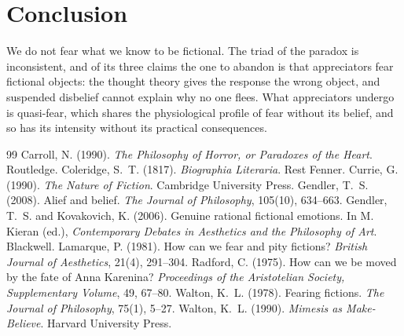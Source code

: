 \documentclass{situationist-preprint}
\begin{document}
\section{Conclusion}

We do not fear what we know to be fictional. The triad of the paradox is inconsistent, and of its three claims the one to abandon is that appreciators fear fictional objects: the thought theory gives the response the wrong object, and suspended disbelief cannot explain why no one flees. What appreciators undergo is quasi-fear, which shares the physiological profile of fear without its belief, and so has its intensity without its practical consequences.

\begin{thebibliography}{99}\small
{} Carroll, N. (1990). \emph{The Philosophy of Horror, or Paradoxes of the Heart}. Routledge.
 Coleridge, S.~T. (1817). \emph{Biographia Literaria}. Rest Fenner.
 Currie, G. (1990). \emph{The Nature of Fiction}. Cambridge University Press.
 Gendler, T.~S. (2008). Alief and belief. \emph{The Journal of Philosophy}, 105(10), 634--663.
 Gendler, T.~S. and Kovakovich, K. (2006). Genuine rational fictional emotions. In M. Kieran (ed.), \emph{Contemporary Debates in Aesthetics and the Philosophy of Art}. Blackwell.
 Lamarque, P. (1981). How can we fear and pity fictions? \emph{British Journal of Aesthetics}, 21(4), 291--304.
 Radford, C. (1975). How can we be moved by the fate of Anna Karenina? \emph{Proceedings of the Aristotelian Society, Supplementary Volume}, 49, 67--80.
 Walton, K.~L. (1978). Fearing fictions. \emph{The Journal of Philosophy}, 75(1), 5--27.
 Walton, K.~L. (1990). \emph{Mimesis as Make-Believe}. Harvard University Press.
\end{thebibliography}
\end{document}

